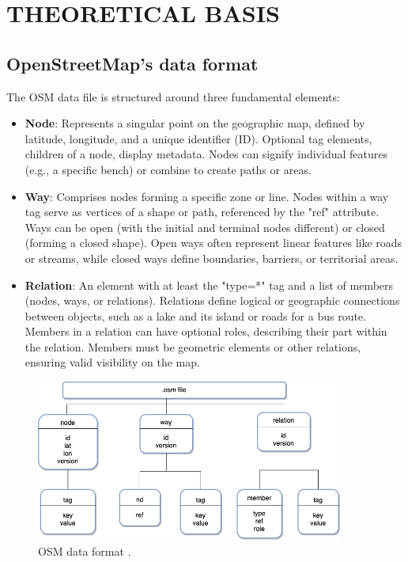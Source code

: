 \section{THEORETICAL BASIS}

\subsection{OpenStreetMap's data format}

The OSM data file is structured around three fundamental elements:

\begin{itemize}
    \item \textbf{Node}: Represents a singular point on the geographic map, defined by latitude, longitude, and a unique identifier (ID). Optional tag elements, children of a node, display metadata. Nodes can signify individual features (e.g., a specific bench) or combine to create paths or areas.
    \item \textbf{Way}: Comprises nodes forming a specific zone or line. Nodes within a way tag serve as vertices of a shape or path, referenced by the "ref" attribute. Ways can be open (with the initial and terminal nodes different) or closed (forming a closed shape). Open ways often represent linear features like roads or streams, while closed ways define boundaries, barriers, or territorial areas.
    \item \textbf{Relation}: An element with at least the "type=*" tag and a list of members (nodes, ways, or relations). Relations define logical or geographic connections between objects, such as a lake and its island or roads for a bus route. Members in a relation can have optional roles, describing their part within the relation. Members must be geometric elements or other relations, ensuring valid visibility on the map.
\end{itemize}

\begin{figure}[H]
    \centering
    \includegraphics[width=0.9\textwidth]{assets/images/Research/System/osm_file_structure.png}
    \caption{OSM data format \cite{osm_file_structure}.}
    \label{fig:osm}
\end{figure}

